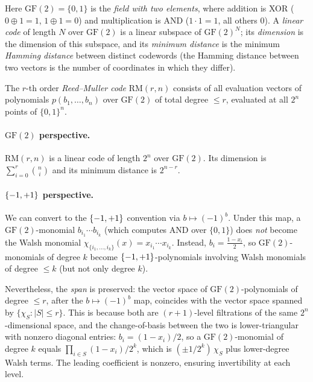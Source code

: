\begin{definition}\label{def:reed-muller}
Here $\text{GF}(2) = \{0, 1\}$ is the \emph{field with two elements},
where addition is XOR ($0 \oplus 1 = 1$, $1 \oplus 1 = 0$) and
multiplication is AND ($1 \cdot 1 = 1$, all others $0$). A
\emph{linear code} of length $N$ over $\text{GF}(2)$ is a linear
subspace of $\text{GF}(2)^N$; its \emph{dimension} is the dimension of
this subspace, and its \emph{minimum distance} is the minimum
\emph{Hamming distance} between distinct codewords (the Hamming
distance between two vectors is the number of coordinates in which
they differ).

The $r$-th order \emph{Reed--Muller code} $\text{RM}(r, n)$ consists of
all evaluation vectors of polynomials $p(b_1, \ldots, b_n)$ over
$\text{GF}(2)$ of total degree $\leq r$, evaluated at all $2^n$ points
of $\{0,1\}^n$.
\end{definition}

\paragraph{$\text{GF}(2)$ perspective.}
$\text{RM}(r, n)$ is a linear code of length $2^n$ over $\text{GF}(2)$.
Its dimension is $\sum_{i=0}^r \binom{n}{i}$ and its minimum distance
is $2^{n-r}$.

\paragraph{$\{-1,+1\}$ perspective.}
We can convert to the $\{-1,+1\}$ convention via $b \mapsto (-1)^b$. Under
this map, a $\text{GF}(2)$-monomial $b_{i_1} \cdots b_{i_k}$ (which
computes AND over $\{0,1\}$) does \emph{not} become the Walsh monomial
$\chi_{\{i_1, \ldots, i_k\}}(x) = x_{i_1} \cdots x_{i_k}$. Instead,
$b_i = \frac{1 - x_i}{2}$, so $\text{GF}(2)$-monomials of degree $k$
become $\{-1,+1\}$-polynomials involving Walsh monomials of degree
$\leq k$ (but not only degree $k$).

Nevertheless, the \emph{span} is preserved: the vector space of
$\text{GF}(2)$-polynomials of degree $\leq r$, after the $b \mapsto (-1)^b$
map, coincides with the vector space spanned by $\{\chi_S : |S| \leq r\}$.
This is because both are $(r+1)$-level filtrations of the same
$2^n$-dimensional space, and the change-of-basis between the two is
lower-triangular with nonzero diagonal entries: $b_i = (1 - x_i)/2$, so a
$\text{GF}(2)$-monomial of degree $k$ equals $\prod_{i \in S}(1-x_i)/2^k$,
which is $(\pm 1/2^k)\,\chi_S$ plus lower-degree Walsh terms. The
leading coefficient is nonzero, ensuring invertibility at each level.

